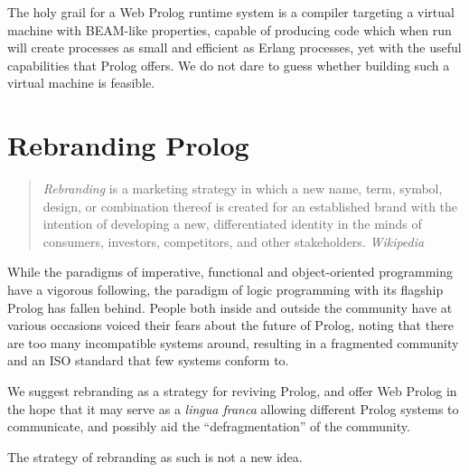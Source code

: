 \documentclass{tlp}
\begin{document}
The holy grail for a Web Prolog runtime system is a compiler targeting a virtual machine with BEAM-like properties, capable of producing code which when run will create processes as small and efficient as Erlang processes, yet with the useful capabilities that Prolog offers. We do not dare to guess whether building such a virtual machine is feasible.


\section{Rebranding Prolog}\label{sec:for-erlangers}

\begin{quote}
\textit{Rebranding} is a marketing strategy in which a new name, term, symbol, design, or combination thereof is created for an established brand with the intention of developing a new, differentiated identity in the minds of consumers, investors, competitors, and other stakeholders. 
\textit{Wikipedia}
\end{quote}

\vspace{2mm}

\noindent While the paradigms of imperative, functional and object-oriented programming have a vigorous following, the paradigm of logic programming with its flagship Prolog has fallen behind. People both inside and outside the community have at various occasions voiced their fears about the future of Prolog, noting that there are too many incompatible systems around, resulting in a fragmented community and an ISO standard that few systems conform to.

We suggest rebranding as a strategy for reviving Prolog, and offer Web Prolog in the hope that it may serve as a \textit{lingua franca} allowing different Prolog systems to communicate, and possibly aid the ``defragmentation'' of the community.

The strategy of rebranding as such is not a new idea. %

\end{document}
